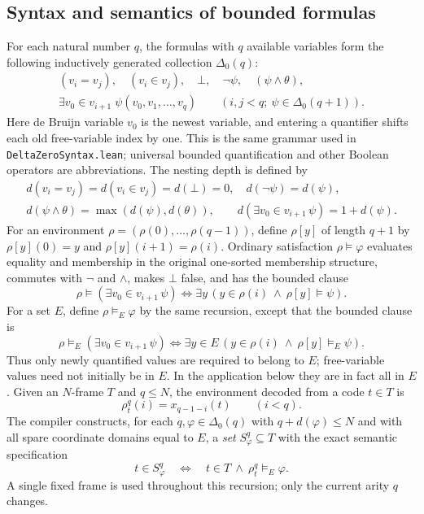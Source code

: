 \documentclass[11pt,a4paper]{article}
\numberwithin{equation}{section}
\newcommand{\Dzero}{\Delta_0}
\begin{document}
\subsection*{Syntax and semantics of bounded formulas}
For each natural number $q$, the formulas with $q$ available variables form the following inductively generated collection $\Dzero(q)$:
\[
\begin{gathered}
(v_i=v_j),\quad (v_i\in v_j),\quad \bot,\quad
\neg\psi,\quad(\psi\wedge\theta),\\
\exists v_0\in v_{i+1}\;\psi(v_0,v_1,\ldots,v_q)
\qquad (i,j<q;\ \psi\in\Dzero(q+1)).
\end{gathered}
\]
Here de Bruijn variable $v_0$ is the newest variable, and entering a quantifier shifts each old free-variable index by one.  This is the same grammar used in \nolinkurl{DeltaZeroSyntax.lean}; universal bounded quantification and other Boolean operators are abbreviations.  The nesting depth is defined by
\[
\begin{gathered}
 d(v_i=v_j)=d(v_i\in v_j)=d(\bot)=0,\quad
 d(\neg\psi)=d(\psi),\\
 d(\psi\wedge\theta)=\max(d(\psi),d(\theta)),\qquad
 d(\exists v_0\in v_{i+1}\,\psi)=1+d(\psi).
\end{gathered}
\]
For an environment $\rho=(\rho(0),\ldots,\rho(q-1))$, define $\rho[y]$ of length $q+1$ by $\rho[y](0)=y$ and $\rho[y](i+1)=\rho(i)$.  Ordinary satisfaction $\rho\models\varphi$ evaluates equality and membership in the original one-sorted membership structure, commutes with $\neg$ and $\wedge$, makes $\bot$ false, and has the bounded clause
\begin{equation}\label{eq:holds}
\rho\models(\exists v_0\in v_{i+1}\,\psi)
\iff\exists y\,(y\in\rho(i)\ \land\ \rho[y]\models\psi).
\end{equation}
For a set $E$, define $\rho\models_E\varphi$ by the same recursion, except that the bounded clause is
\begin{equation}\label{eq:holdsE}
\rho\models_E(\exists v_0\in v_{i+1}\,\psi)
\iff\exists y\in E\,(y\in\rho(i)\ \land\ \rho[y]\models_E\psi).
\end{equation}
Thus only newly quantified values are required to belong to $E$; free-variable values need not initially be in $E$.  In the application below they are in fact all in $E$.  Given an $N$-frame $T$ and $q\le N$, the environment decoded from a code $t\in T$ is
\begin{equation}\label{eq:rho}
\rho^q_t(i)=x_{q-1-i}(t)\qquad(i<q).
\end{equation}
The compiler constructs, for each $q,\varphi\in\Dzero(q)$ with $q+d(\varphi)\le N$ and with all spare coordinate domains equal to $E$, a \emph{set} $S^q_\varphi\subseteq T$ with the exact semantic specification
\begin{equation}\label{eq:compiler-spec}
t\in S^q_\varphi\quad\Longleftrightarrow\quad
 t\in T\ \land\ \rho^q_t\models_E\varphi.
\end{equation}
A single fixed frame is used throughout this recursion; only the current arity $q$ changes.
\end{document}
